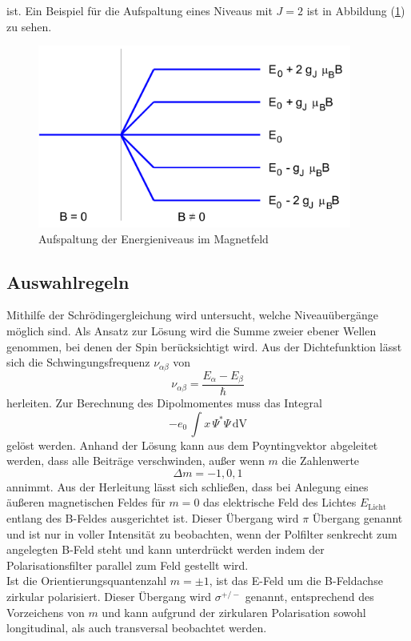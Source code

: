 ist. Ein Beispiel für die Aufspaltung eines Niveaus mit $J=2$ ist in Abbildung (\ref{fig:Eniv}) zu sehen.
\begin{figure}
  \centering
  \includegraphics[height=6cm]{./Bilder/ENiveaus.png}
  \caption{Aufspaltung der Energieniveaus im Magnetfeld \cite{V27}}
   \label{fig:Eniv}
\end{figure}

\subsection{Auswahlregeln}
Mithilfe der Schrödingergleichung wird untersucht, welche Niveauübergänge möglich sind. Als Ansatz zur Lösung wird die Summe zweier ebener Wellen genommen, bei denen der Spin berücksichtigt wird. Aus der Dichtefunktion lässt sich die Schwingungsfrequenz $\nu_{\alpha\beta}$ von
\begin{equation}
  \nu_{\alpha\beta}= \frac{E_{\alpha} - E_{\beta}}{\hbar}
  \label{eqn:nu}
\end{equation}
herleiten. Zur Berechnung des Dipolmomentes muss das Integral
\begin{equation}
  -e_0\, \int x \, \Psi^* \Psi \, \text{dV}
\end{equation}
gelöst werden. Anhand der Lösung kann aus dem Poyntingvektor abgeleitet werden, dass alle Beiträge verschwinden, außer wenn $m$ die Zahlenwerte
\begin{equation}
  \Delta m = -1,0,1
\end{equation}
annimmt. Aus der Herleitung lässt sich schließen, dass bei Anlegung eines äußeren magnetischen Feldes für $m = 0$ das elektrische Feld des Lichtes $E_\text{Licht}$ entlang des B-Feldes ausgerichtet ist. Dieser Übergang wird $\pi$ Übergang genannt und ist nur in voller Intensität zu beobachten, wenn der Polfilter senkrecht zum angelegten B-Feld steht und kann unterdrückt werden indem der Polarisationsfilter parallel zum Feld gestellt wird. \\
Ist die Orientierungsquantenzahl $m = \pm 1$, ist das E-Feld um die B-Feldachse zirkular polarisiert. Dieser Übergang wird $\sigma^{+/-}$ genannt, entsprechend des Vorzeichens von $m$ und kann aufgrund der zirkularen Polarisation sowohl longitudinal, als auch transversal beobachtet werden. 

